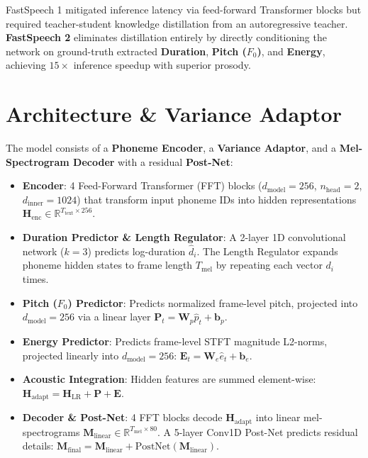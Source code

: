 \documentclass[10pt,twocolumn,a4paper]{article}
\begin{document}
FastSpeech 1 mitigated inference latency via feed-forward Transformer blocks but required teacher-student knowledge distillation from an autoregressive teacher. \textbf{FastSpeech 2} eliminates distillation entirely by directly conditioning the network on ground-truth extracted \textbf{Duration}, \textbf{Pitch ($F_0$)}, and \textbf{Energy}, achieving $15\times$ inference speedup with superior prosody.

\section{Architecture \& Variance Adaptor}

The model consists of a \textbf{Phoneme Encoder}, a \textbf{Variance Adaptor}, and a \textbf{Mel-Spectrogram Decoder} with a residual \textbf{Post-Net}:
\begin{itemize}[noitemsep]
    \item \textbf{Encoder}: 4 Feed-Forward Transformer (FFT) blocks ($d_{\text{model}}=256$, $n_{\text{head}}=2$, $d_{\text{inner}}=1024$) that transform input phoneme IDs into hidden representations $\mathbf{H}_{\text{enc}} \in \mathbb{R}^{T_{\text{text}} \times 256}$.
    \item \textbf{Duration Predictor \& Length Regulator}: A 2-layer 1D convolutional network ($k=3$) predicts log-duration $\hat{d}_i$. The Length Regulator expands phoneme hidden states to frame length $T_{\text{mel}}$ by repeating each vector $d_i$ times.
    \item \textbf{Pitch ($F_0$) Predictor}: Predicts normalized frame-level pitch, projected into $d_{\text{model}}=256$ via a linear layer $\mathbf{P}_t = \mathbf{W}_p \hat{p}_t + \mathbf{b}_p$.
    \item \textbf{Energy Predictor}: Predicts frame-level STFT magnitude L2-norms, projected linearly into $d_{\text{model}}=256$: $\mathbf{E}_t = \mathbf{W}_e \hat{e}_t + \mathbf{b}_e$.
    \item \textbf{Acoustic Integration}: Hidden features are summed element-wise: $\mathbf{H}_{\text{adapt}} = \mathbf{H}_{\text{LR}} + \mathbf{P} + \mathbf{E}$.
    \item \textbf{Decoder \& Post-Net}: 4 FFT blocks decode $\mathbf{H}_{\text{adapt}}$ into linear mel-spectrograms $\mathbf{M}_{\text{linear}} \in \mathbb{R}^{T_{\text{mel}} \times 80}$. A 5-layer Conv1D Post-Net predicts residual details: $\mathbf{M}_{\text{final}} = \mathbf{M}_{\text{linear}} + \text{PostNet}(\mathbf{M}_{\text{linear}})$.
\end{itemize}
\end{document}
